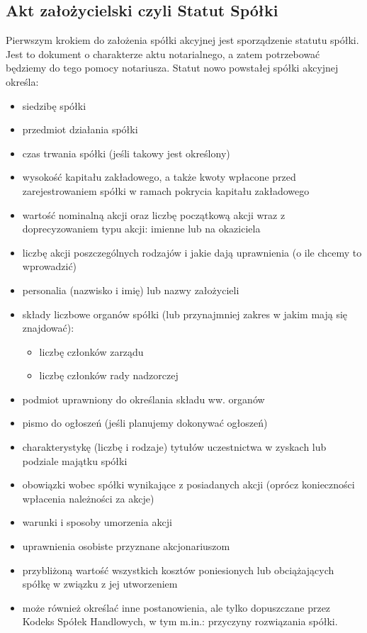 \documentclass[11pt]{article}
\begin{document}
	\subsection{Akt założycielski czyli Statut Spółki}
	
	
Pierwszym krokiem do założenia spółki akcyjnej jest sporządzenie statutu spółki.
	Jest to dokument o charakterze aktu notarialnego, a zatem potrzebować będziemy do tego pomocy notariusza. 
Statut nowo powstałej spółki akcyjnej określa:
\begin{itemize}
\item siedzibę spółki
\item przedmiot działania spółki
\item czas trwania spółki (jeśli takowy jest określony)
\item wysokość kapitału zakładowego, a także kwoty wpłacone przed zarejestrowaniem spółki w ramach pokrycia kapitału zakładowego
\item wartość nominalną akcji oraz liczbę początkową akcji wraz z doprecyzowaniem typu akcji: imienne lub na okaziciela
\item liczbę akcji poszczególnych rodzajów i jakie dają uprawnienia (o ile chcemy to wprowadzić)
\item personalia (nazwisko i imię) lub nazwy założycieli
\item składy liczbowe organów spółki (lub przynajmniej zakres w jakim mają się znajdować):
\begin{itemize}
\item liczbę członków zarządu
\item liczbę członków rady nadzorczej
\end{itemize}
\item podmiot uprawniony do określania składu ww. organów
\item pismo do ogłoszeń (jeśli planujemy dokonywać ogłoszeń)
\item charakterystykę (liczbę i rodzaje) tytułów uczestnictwa w zyskach lub podziale majątku spółki
\item obowiązki wobec spółki wynikające z posiadanych akcji (oprócz konieczności wpłacenia należności za akcje)
\item warunki  i sposoby umorzenia akcji
\item uprawnienia osobiste przyznane akcjonariuszom
\item przybliżoną wartość wszystkich kosztów poniesionych lub obciążających spółkę w związku z jej utworzeniem
\item może również określać inne postanowienia, ale tylko dopuszczane przez Kodeks Spółek Handlowych, w tym m.in.: przyczyny rozwiązania spółki.
\end{itemize}
\end{document}
